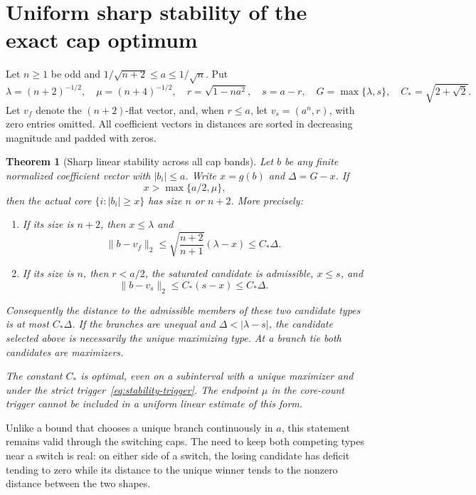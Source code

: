 \documentclass[11pt]{article}
\newtheorem{theorem}{Theorem}[section]
\theoremstyle{remark}\newtheorem{remark}[theorem]{Remark}
\begin{document}
\section{Uniform sharp stability of the exact cap optimum}
\label{sec:all-cap-gap-stability}

Let $n\ge1$ be odd and $1/\sqrt{n+2}\le a\le1/\sqrt n$. Put
\[
 \lambda=(n+2)^{-1/2},\quad \mu=(n+4)^{-1/2},\quad
 r=\sqrt{1-na^2},\quad s=a-r,\quad G=\max\{\lambda,s\},
 \quad C_* =\sqrt{2+\sqrt2}.
\]
Let $v_f$ denote the $(n+2)$-flat vector, and, when $r\le a$,
let $v_s=(a^n,r)$, with zero entries omitted. All coefficient vectors
in distances are sorted in decreasing magnitude and padded with zeros.

\begin{theorem}[Sharp linear stability across all cap bands]
\label{thm:all-cap-gap-stability}
Let $b$ be any finite normalized coefficient vector with $|b_i|\le a$.
Write $x=g(b)$ and $\Delta=G-x$. If
\begin{equation}\label{eq:stability-trigger}
 x>\max\{a/2,\mu\},
\end{equation}
then the actual core $\{i:|b_i|\ge x\}$ has size $n$ or $n+2$.
More precisely:
\begin{enumerate}
\item If its size is $n+2$, then $x\le\lambda$ and
\[
 \|b-v_f\|_2\le
 \sqrt{\frac{n+2}{n+1}}(\lambda-x)\le C_*\Delta.
\]
\item If its size is $n$, then $r<a/2$, the saturated candidate is
admissible, $x\le s$, and
\[
 \|b-v_s\|_2\le C_*(s-x)\le C_*\Delta.
\]
\end{enumerate}
Consequently the distance to the admissible members of these two candidate types is at
most $C_*\Delta$. If the branches are unequal and
$\Delta<|\lambda-s|$, the candidate selected above is necessarily the
unique maximizing type. At a branch tie both candidates are maximizers.

The constant $C_*$ is optimal, even on a subinterval with a unique
maximizer and under the strict trigger~\eqref{eq:stability-trigger}.
The endpoint $\mu$ in the core-count trigger cannot be included in a
uniform linear estimate of this form.
\end{theorem}

Unlike a bound that chooses a unique branch continuously in $a$, this
statement remains valid through the switching caps. The need to keep
both competing types near a switch is real: on either side of a switch,
the losing candidate has deficit tending to zero while its distance to
the unique winner tends to the nonzero distance between the two shapes.
\end{document}
